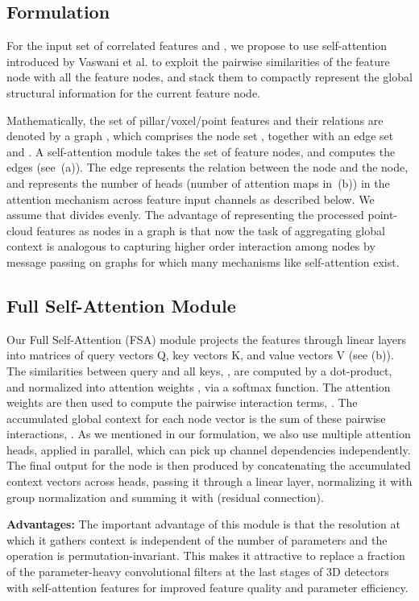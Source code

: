 \documentclass[10pt,twocolumn,letterpaper]{article}
\begin{document}
\subsection{Formulation}
For the input set  of  correlated features and , we propose to use self-attention introduced by Vaswani et al. \cite{SA} to exploit the pairwise similarities of the  feature node with all the feature nodes, and stack them to compactly represent the global structural information for the current feature node. 

Mathematically, the set of pillar/voxel/point features and their relations are denoted by a graph , which comprises the node set , together with an edge set  and . A self-attention module takes the set of feature nodes, and computes the edges (see \,(a)). The edge  represents the relation between the  node and the  node, and  represents the number of heads (number of attention maps in \,(b)) in the attention mechanism across  feature input channels as described below. We assume that  divides  evenly. The advantage of representing the processed point-cloud features as nodes in a graph is that now the task of aggregating global context is analogous to capturing higher order interaction among nodes by message passing on graphs for which many mechanisms like self-attention exist. 

\subsection{Full Self-Attention Module}
Our Full Self-Attention (FSA) module projects the features  through linear layers into matrices of query vectors Q, key vectors K, and value vectors V (see (b)). The similarities between query  and all keys, , are computed by a dot-product, and normalized into attention weights , via a softmax function. The attention weights are then used to compute the pairwise interaction terms, . The accumulated global context for each node vector  is the sum of these pairwise interactions, . As we mentioned in our formulation, we also use multiple attention heads, applied in parallel, which can pick up channel dependencies independently. The final output for the node  is then produced by concatenating the accumulated context vectors  across heads, passing it through a linear layer, normalizing it with group normalization \cite{group} and summing it with  (residual connection).

\textbf{Advantages:} The important advantage of this module is that the resolution at which it gathers context is independent of the number of parameters and the operation is permutation-invariant. This makes it attractive to replace a fraction of the parameter-heavy convolutional filters at the last stages of 3D detectors with self-attention features for improved feature quality and parameter efficiency.
\end{document}
